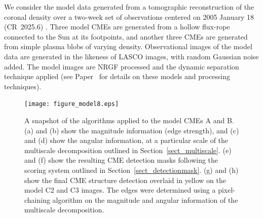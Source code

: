 \documentclass[preprint2]{aastex}
\newcommand{\RNum}[1]{\uppercase\expandafter{\romannumeral #1\relax}}
\begin{document}
We consider the model data generated from a tomographic reconstruction of the coronal density over a two-week set of observations centered on 2005 January 18 (CR~2025.6) \citep{2009ApJ...690.1119M}. Three model CMEs are generated from a hollow flux-rope connected to the Sun at its footpoints, and another three CMEs are generated from simple plasma blobs of varying density. Observational images of the model data are generated in the likeness of LASCO images, with random Gaussian noise added. The model images are NRGF processed and the dynamic separation technique applied (see Paper~\RNum{1} for details on these models and processing techniques).

\begin{figure}[!t]
\centerline{\texttt{[image: figure\_model8.eps]}}
\caption{A snapshot of the algorithms applied to the model CMEs A and B. (a) and (b) show the magnitude information (edge strength), and (c) and (d) show the angular information, at a particular scale of the multiscale decomposition outlined in Section~\ref{sect_multiscale}. (e) and (f) show the resulting CME detection masks following the scoring system outlined in Section~\ref{sect_detectionmask}. (g) and (h) show the final CME structure detection overlaid in yellow on the model C2 and C3 images. The edges were determined using a pixel-chaining algorithm on the magnitude and angular information of the multiscale decomposition.}
\label{figure_model8}
\end{figure}
\end{document}
